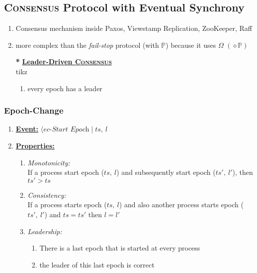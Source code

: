 \documentclass{article}
\begin{document}
\begin{adjustwidth}{2em}{2em}
		\subsection{\textsc{Consensus} Protocol with Eventual Synchrony}
		\begin{adjustwidth}{2em}{2em}
			\begin{enumerate}[-]
				\item Consensus mechanism inside Paxos, Viewstamp Replication, ZooKeeper, Raff
				\item more complex than the \textit{fail-stop} protocol (with $\mathbb{P}$) because it uses $\Omega$ $(\diamond \mathbb{P})$
				\item[\textbf{*}] \textbf{\underline{Leader-Driven \textsc{Consensus}}}  \\
				tikz
				\begin{enumerate}[-]
					\item every epoch has a leader
				\end{enumerate}
			\end{enumerate}
			\subsubsection{Epoch-Change}
			\begin{adjustwidth}{2em}{}
				\begin{enumerate}[]
					\item \textbf{\underline{Event:}} $\langle \textit{ec-Start Epoch} \mid ts, \ l$
					\item \textbf{\underline{Properties:}}
					\begin{enumerate}[]
						\item \textit{Monotonicity:} \\
						If a process start epoch ($ts, \ l$) and subsequently start epoch ($ts', \ l'$), then $ts' > ts$
						\item \textit{Consistency:} \\
						If a process starts epoch ($ts, \ l$) and also another process starts epoch ($ts', \ l'$) and $ts = ts'$ then $l = l'$
						\item \textit{Leadership:}
						\begin{enumerate}[-]
							\item There is a last epoch that is started at every process
							\item the leader of this last epoch is correct
						\end{enumerate}
					\end{enumerate}
				\end{enumerate}
			\end{adjustwidth}

\end{adjustwidth}
\end{adjustwidth}
\end{document}
